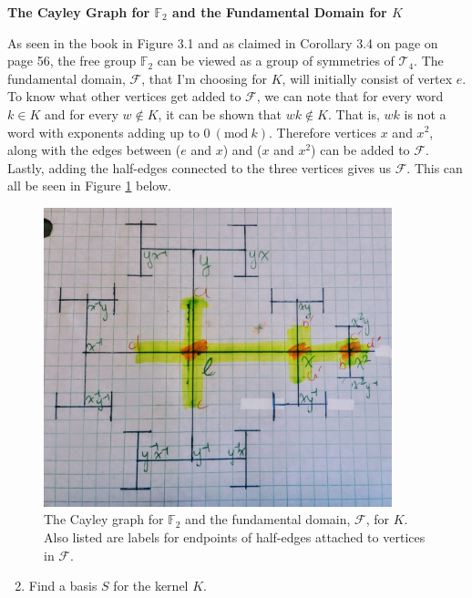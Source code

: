 \documentclass[12pt]{article}%
\newcommand{\F}{\mathbb{F}}
\newcommand{\Mod}[1]{\ (\mathrm{mod}\ #1)}
\begin{document}
\textbf{The Cayley Graph for $\F_2$ and the Fundamental Domain for $K$}

As seen in the book in Figure 3.1 and as claimed in Corollary 3.4 on page on page 56, the free group
$\F_2$ can be viewed as a group of symmetries of $\mathcal{T}_4$. The fundamental domain, $\mathcal{F}$,
that I'm choosing for $K$, will initially consist of vertex $e$. To know what other vertices get added to
$\mathcal{F}$, we can note that for every word $k\in K$ and for every $w\not\in K$, it can be shown that
$wk\not\in K$. That is, $wk$ is not a word with exponents adding up to $0\Mod{k}$. Therefore vertices $x$
and $x^2$, along with the edges between ($e$ and $x$) and ($x$ and $x^2$) can be added to $\mathcal{F}$.
Lastly, adding the half-edges connected to the three vertices gives us $\mathcal{F}$. This can all be seen
in Figure \ref{fig:fun_domain_of_K} below.

\begin{figure}[ht]
    \centering
    \includegraphics[width=0.9\textwidth]{images/fundamental_domain_for_K.jpg}
    \caption{The Cayley graph for $\F_2$ and the fundamental domain, $\mathcal{F}$, for $K$. Also listed are labels for endpoints of half-edges attached to vertices in $\mathcal{F}$.}
    \label{fig:fun_domain_of_K}
\end{figure}

\begin{enumerate}
  \setcounter{enumi}{1}
  \item Find a basis $S$ for the kernel $K$.
\end{enumerate}
\end{document}
